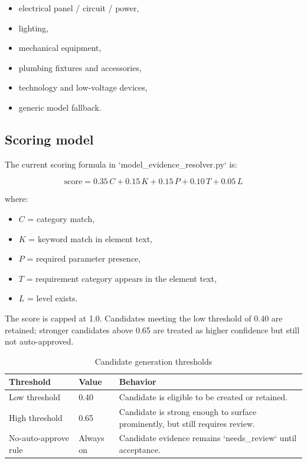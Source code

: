 \documentclass[10pt,letterpaper]{article}
\begin{document}
\begin{itemize}
  \item electrical panel / circuit / power,
  \item lighting,
  \item mechanical equipment,
  \item plumbing fixtures and accessories,
  \item technology and low-voltage devices,
  \item generic model fallback.
\end{itemize}

\subsection{Scoring model}

The current scoring formula in `model_evidence_resolver.py` is:

\[
\text{score} = 0.35\,C + 0.15\,K + 0.15\,P + 0.10\,T + 0.05\,L
\]

where:

\begin{itemize}
  \item $C$ = category match,
  \item $K$ = keyword match in element text,
  \item $P$ = required parameter presence,
  \item $T$ = requirement category appears in the element text,
  \item $L$ = level exists.
\end{itemize}

The score is capped at 1.0. Candidates meeting the low threshold of 0.40 are retained; stronger candidates above 0.65 are treated as higher confidence but still not auto-approved.

\begin{longtable}{p{1.8in}p{1.9in}p{2.0in}}
\caption{Candidate generation thresholds}\label{tab:candidate-thresholds}\\
\toprule
\textbf{Threshold} & \textbf{Value} & \textbf{Behavior} \\
\midrule
\endhead
Low threshold & 0.40 & Candidate is eligible to be created or retained. \\
High threshold & 0.65 & Candidate is strong enough to surface prominently, but still requires review. \\
No-auto-approve rule & Always on & Candidate evidence remains `needs_review` until acceptance. \\
\bottomrule
\end{longtable}
\end{document}
